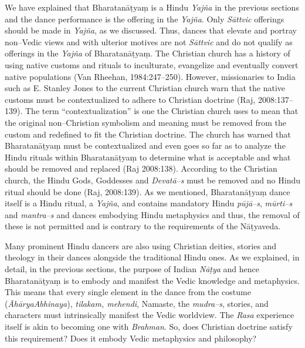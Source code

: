 We have explained that Bharatanāṭyaṃ is a Hindu \textit{Yajña} in the previous sections and the dance performance is the offering in the \textit{Yajña}. Only \textit{Sāttvic} offerings should be made in \textit{Yajña}, as we discussed. Thus, dances that elevate and portray non–Vedic views and with ulterior motives are not \textit{Sāttvic} and do not qualify as offerings in the \textit{Yajña} of Bharatanāṭyaṃ. The Christian church has a history of using native customs and rituals to inculturate, evangelize and eventually convert native populations (Van Rheehan, 1984:247–250). However, missionaries to India such as E. Stanley Jones to the current Christian church warn that the native customs must be contextualized to adhere to Christian doctrine (Raj, 2008:137–139). The term “contextualization” is one the Christian church uses to mean that the original non–Christian symbolism and meaning must be removed from the custom and redefined to fit the Christian doctrine. The church has warned that Bharatanāṭyaṃ must be contextualized and even goes so far as to analyze the Hindu rituals within Bharatanāṭyaṃ to determine what is acceptable and what should be removed and replaced (Raj 2008:138). According to the Christian church, the Hindu Gods, Goddesses and \textit{Devatā–s} must be removed and no Hindu ritual should be done (Raj, 2008:139). As we mentioned, Bharatanāṭyaṃ dance itself is a Hindu ritual, a \textit{Yajña}, and contains mandatory Hindu \textit{pūjā–s}, \textit{mūrti–s} and \textit{mantra–s} and dances embodying Hindu metaphysics and thus, the removal of these is not permitted and is contrary to the requirements of the Nāṭyaveda.

\vskip 2pt

Many prominent Hindu dancers are also using Christian deities, stories and theology in their dances alongside the traditional Hindu ones. As we explained, in detail, in the previous sections, the purpose of Indian \textit{Nāṭya }and hence Bharatanāṭyaṃ is to embody and manifest the Vedic knowledge and metaphysics. This means that every single element in the dance from the costume (\textit{ĀhāryaAbhinaya}), \textit{tilakam, mehendi}, Namaste, the \textit{mudra–s}, stories, and characters must intrinsically manifest the Vedic worldview. The \textit{Rasa} experience itself is akin to becoming one with \textit{Brahman}. So, does Christian doctrine satisfy this requirement? Does it embody Vedic metaphysics and philosophy?

